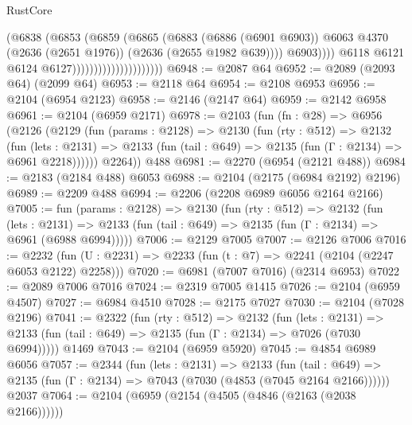 \begin{lexlean}{RustCore}
\begin{coremodule}
                                                (@6838
                                                  (@6853
                                                    (@6859
                                                      (@6865
                                                        (@6883
                                                          (@6886 (@6901 @6903))
                                                          @6063
                                                          @4370
                                                          (@2636 (@2651 @1976))
                                                          (@2636 (@2655 @1982 @639))))
                                                      @6903))))
                                              @6118
                                              @6121
                                              @6124
                                              @6127)))))))))))))))))))))
@6948 := @2087 @64
@6952 := @2089 (@2093 @64) (@2099 @64)
@6953 := @2118 @64
@6954 := @2108 @6953
@6956 := @2104 (@6954 @2123)
@6958 := @2146 (@2147 @64)
@6959 := @2142 @6958
@6961 := @2104 (@6959 @2171)
@6978 := @2103
    (fun (fn : @28) =>
    @6956
      (@2126
        (@2129
          (fun (params : @2128) =>
          @2130
            (fun (rty : @512) =>
            @2132
              (fun (lets : @2131) =>
              @2133 (fun (tail : @649) => @2135 (fun (Γ : @2134) => @6961 @2218))))))
        @2264))
    @488
@6981 := @2270 (@6954 (@2121 @488))
@6984 := @2183 (@2184 @488) @6053
@6988 := @2104 (@2175 (@6984 @2192) @2196)
@6989 := @2209 @488
@6994 := @2206 (@2208 @6989 @6056 @2164 @2166)
@7005 := fun (params : @2128) =>
  @2130
    (fun (rty : @512) =>
    @2132
      (fun (lets : @2131) =>
      @2133 (fun (tail : @649) => @2135 (fun (Γ : @2134) => @6961 (@6988 @6994)))))
@7006 := @2129 @7005
@7007 := @2126 @7006
@7016 := @2232 (fun (U : @2231) => @2233 (fun (t : @7) => @2241 (@2104 (@2247 @6053 @2122) @2258)))
@7020 := @6981 (@7007 @7016) (@2314 @6953)
@7022 := @2089 @7006 @7016
@7024 := @2319 @7005 @1415
@7026 := @2104 (@6959 @4507)
@7027 := @6984 @4510
@7028 := @2175 @7027
@7030 := @2104 (@7028 @2196)
@7041 := @2322
    (fun (rty : @512) =>
    @2132
      (fun (lets : @2131) =>
      @2133 (fun (tail : @649) => @2135 (fun (Γ : @2134) => @7026 (@7030 @6994)))))
    @1469
@7043 := @2104 (@6959 @5920)
@7045 := @4854 @6989 @6056
@7057 := @2344
    (fun (lets : @2131) =>
    @2133
      (fun (tail : @649) => @2135 (fun (Γ : @2134) => @7043 (@7030 (@4853 (@7045 @2164 @2166))))))
    @2037
@7064 := @2104 (@6959 (@2154 (@4505 (@4846 (@2163 (@2038 @2166))))))

\end{coremodule}
\end{lexlean}
